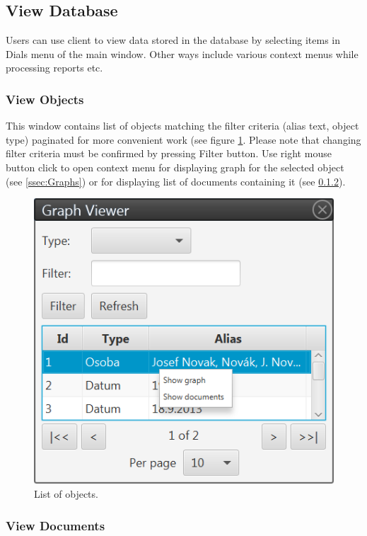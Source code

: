 \subsection{View Database}
\label{ssec:ViewDatabase}

Users can use client to view data stored in the database by selecting items
in Dials menu of the main window. Other ways include various context menus
while processing reports etc.

\subsubsection{View Objects}
\label{sssec:ObjectList}

This window contains list of objects matching the filter criteria (alias text,
object type) paginated for more convenient work (see figure \ref{fig:ObjectList}.
Please note that changing filter criteria must be confirmed by pressing Filter
button. Use right mouse button click to open context menu for displaying graph
for the selected object (see \ref{ssec:Graphs}) or for displaying list of documents
containing it (see \ref{sssec:DocumentList}).

\begin{figure}[!htb]
        \centering
        \includegraphics{Images/objectlist}
        \caption{List of objects.}
        \label{fig:ObjectList}
\end{figure}

\subsubsection{View Documents}
\label{sssec:DocumentList}

